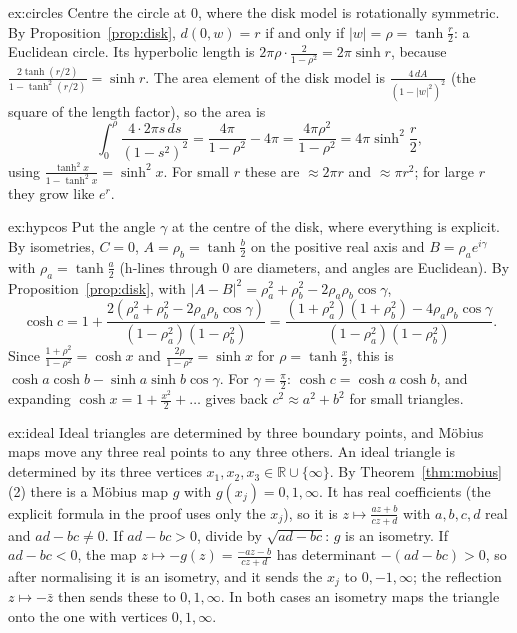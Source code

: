 \begin{solution}{ex:circles}
\idea Centre the circle at $0$, where the disk model is rotationally symmetric.
\writeup By Proposition~\ref{prop:disk}, $d(0,w)=r$ if and only if $|w|=\rho=\tanh\frac r2$: a Euclidean circle. Its hyperbolic length is
$2\pi\rho\cdot\frac2{1-\rho^2}=2\pi\sinh r$, because $\frac{2\tanh(r/2)}{1-\tanh^2(r/2)}=\sinh r$. The area element of the disk model is $\frac{4\,dA}{(1-|w|^2)^2}$
(the square of the length factor), so the area is
\[
\int_0^\rho\frac{4\cdot2\pi s\,ds}{(1-s^2)^2}=\frac{4\pi}{1-\rho^2}-4\pi=\frac{4\pi\rho^2}{1-\rho^2}=4\pi\sinh^2\frac r2,
\]
using $\frac{\tanh^2x}{1-\tanh^2x}=\sinh^2x$. For small $r$ these are $\approx2\pi r$ and $\approx\pi r^2$; for large $r$ they grow like $e^r$.
\end{solution}

\begin{solution}{ex:hypcos}
\idea Put the angle $\gamma$ at the centre of the disk, where everything is explicit.
\writeup By isometries, $C=0$, $A=\rho_b=\tanh\frac b2$ on the positive real axis and $B=\rho_ae^{i\gamma}$ with $\rho_a=\tanh\frac a2$ (h-lines through $0$ are
diameters, and angles are Euclidean). By Proposition~\ref{prop:disk}, with $|A-B|^2=\rho_a^2+\rho_b^2-2\rho_a\rho_b\cos\gamma$,
\[
\cosh c=1+\frac{2(\rho_a^2+\rho_b^2-2\rho_a\rho_b\cos\gamma)}{(1-\rho_a^2)(1-\rho_b^2)}=\frac{(1+\rho_a^2)(1+\rho_b^2)-4\rho_a\rho_b\cos\gamma}{(1-\rho_a^2)(1-\rho_b^2)}.
\]
Since $\frac{1+\rho^2}{1-\rho^2}=\cosh x$ and $\frac{2\rho}{1-\rho^2}=\sinh x$ for $\rho=\tanh\frac x2$, this is $\cosh a\cosh b-\sinh a\sinh b\cos\gamma$. For
$\gamma=\frac\pi2$: $\cosh c=\cosh a\cosh b$, and expanding $\cosh x=1+\frac{x^2}2+\dots$ gives back $c^2\approx a^2+b^2$ for small triangles.
\end{solution}

\begin{solution}{ex:ideal}
\idea Ideal triangles are determined by three boundary points, and M\"obius maps move any three real points to any three others.
\writeup An ideal triangle is determined by its three vertices $x_1,x_2,x_3\in\mathbb R\cup\{\infty\}$. By Theorem~\ref{thm:mobius}(2) there is a M\"obius map
$g$ with $g(x_j)=0,1,\infty$. It has real coefficients (the explicit formula in the proof uses only the $x_j$), so it is $z\mapsto\frac{az+b}{cz+d}$ with
$a,b,c,d$ real and $ad-bc\ne0$. If $ad-bc>0$, divide by $\sqrt{ad-bc}$: $g$ is an isometry. If $ad-bc<0$, the map $z\mapsto-g(z)=\frac{-az-b}{cz+d}$ has determinant $-(ad-bc)>0$, so after normalising it is an isometry, and it sends the $x_j$ to
$0,-1,\infty$; the reflection $z\mapsto-\bar z$ then sends these to $0,1,\infty$. In both cases an isometry maps the triangle onto the one with vertices $0,1,\infty$.
\end{solution}


